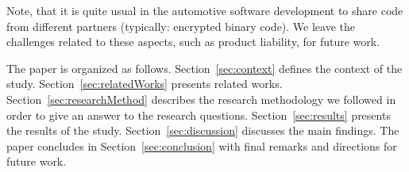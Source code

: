 %



Note, that it is quite usual in the automotive software development to share code from different partners (typically: encrypted binary code). We leave the challenges related to these aspects, such as product liability, for future work.



The paper is organized as follows. Section~\ref{sec:context} defines the context of the study. 
Section~\ref{sec:relatedWorks} presents related works.
Section~\ref{sec:researchMethod} describes the research methodology we followed in order to give an answer to the research questions.
Section~\ref{sec:results} presents the results of the study. Section~\ref{sec:discussion} discusses the main findings.  
The paper concludes in Section~\ref{sec:conclusion} with final remarks and directions for future work.

